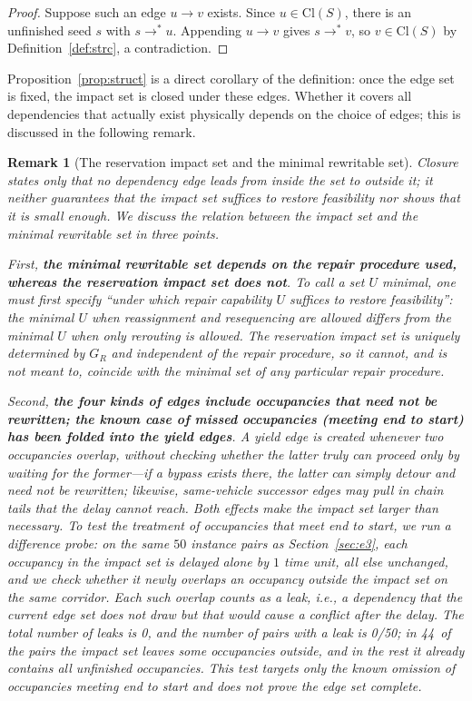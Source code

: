 \documentclass[manuscript,screen,review]{acmart}
\newcommand{\NPairs}{50}
\newcommand{\ProbeLeakPairs}{0/50}
\newcommand{\ProbeLeaks}{0}
\newcommand{\ProbeOutsidePairs}{44}  %
\newtheorem{remark}{Remark}
\begin{document}
\begin{proof}
Suppose such an edge \(u\to v\) exists. Since \(u\in\mathrm{Cl}(S)\), there is an unfinished seed \(s\) with
\(s\to^* u\). Appending \(u\to v\) gives \(s\to^* v\), so \(v\in\mathrm{Cl}(S)\) by Definition~\ref{def:strc},
a contradiction.
\end{proof}

Proposition~\ref{prop:struct} is a direct corollary of the definition: once the edge set is fixed, the impact set is closed under these edges.
Whether it covers all dependencies that actually exist physically depends on the choice of edges; this is discussed in the following remark.

\begin{remark}[The reservation impact set and the minimal rewritable set]
\label{rem:minimality}
Closure states only that no dependency edge leads from inside the set to outside it; it neither guarantees that the impact set suffices to restore feasibility nor shows that it is small enough.
We discuss the relation between the impact set and the minimal rewritable set in three points.

First, \textbf{the minimal rewritable set depends on the repair procedure used, whereas the reservation impact set does not}.
To call a set \(U\) minimal, one must first specify ``under which repair capability \(U\) suffices to restore feasibility'': the minimal \(U\) when reassignment and resequencing are allowed
differs from the minimal \(U\) when only rerouting is allowed. The reservation impact set is uniquely determined by \(G_R\) and independent of the repair procedure,
so it cannot, and is not meant to, coincide with the minimal set of any particular repair procedure.

Second, \textbf{the four kinds of edges include occupancies that need not be rewritten; the known case of missed occupancies (meeting end to start) has been folded into the yield edges}.
A yield edge is created whenever two occupancies overlap, without checking whether the latter \emph{truly} can proceed only by waiting for the former---if a bypass exists there,
the latter can simply detour and need not be rewritten; likewise, same-vehicle successor edges may pull in chain tails that the delay cannot reach. Both effects make the impact set larger than necessary.
To test the treatment of occupancies that meet end to start, we run a \emph{difference probe}: on the same \(\NPairs\) instance pairs as Section~\ref{sec:e3},
each occupancy in the impact set is delayed alone by \(1\) time unit, all else unchanged, and we check whether it newly overlaps an occupancy outside the impact set on the same corridor.
Each such overlap counts as a leak, i.e., a dependency that the current edge set does not draw but that would cause a conflict after the delay.
The total number of leaks is \ProbeLeaks, and the number of pairs with a leak is \ProbeLeakPairs; in \ProbeOutsidePairs\ of the pairs the impact set leaves some occupancies outside,
and in the rest it already contains all unfinished occupancies. This test targets only the known omission of occupancies meeting end to start and does not prove the edge set complete.


\end{remark}
\end{document}
